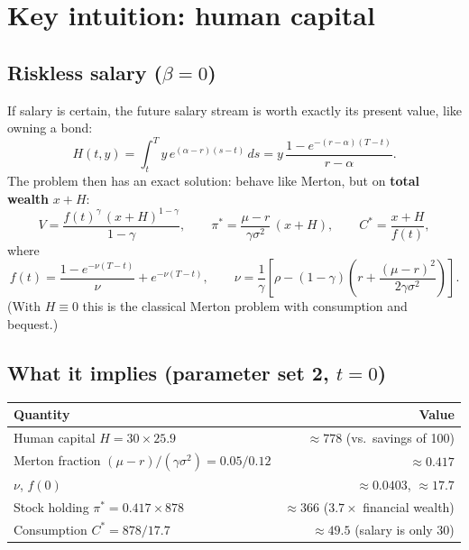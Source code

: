 \documentclass[11pt]{article}
\begin{document}
\section{Key intuition: human capital}

\subsection{Riskless salary ($\beta=0$)}
If salary is certain, the future salary stream is worth exactly its present value,
like owning a bond:
\begin{equation}\label{eq:human-capital}
H(t,y) = \int_t^T y\,e^{(\alpha-r)(s-t)}\,ds
       = y\,\frac{1-e^{-(r-\alpha)(T-t)}}{r-\alpha}.
\end{equation}
The problem then has an exact solution: behave like Merton, but on
\textbf{total wealth} $x+H$:
\begin{equation}\label{eq:det-income}
V = \frac{f(t)^\gamma\,(x+H)^{1-\gamma}}{1-\gamma},\qquad
\pi^* = \frac{\mu-r}{\gamma\sigma^2}\,(x+H),\qquad
C^* = \frac{x+H}{f(t)},
\end{equation}
where
\[
f(t) = \frac{1-e^{-\nu(T-t)}}{\nu} + e^{-\nu(T-t)},
\qquad
\nu = \frac{1}{\gamma}\left[\rho - (1-\gamma)\left(r + \frac{(\mu-r)^2}{2\gamma\sigma^2}\right)\right].
\]
(With $H\equiv0$ this is the classical Merton problem with consumption and bequest.)

\subsection{What it implies (parameter set 2, $t=0$)}
\begin{center}
\begin{tabular}{lr}
\toprule
Quantity & Value \\
\midrule
Human capital $H = 30\times 25.9$ & $\approx 778$ \quad(vs.\ savings of 100) \\
Merton fraction $(\mu-r)/(\gamma\sigma^2) = 0.05/0.12$ & $\approx 0.417$ \\
$\nu$,\; $f(0)$ & $\approx 0.0403$,\; $\approx 17.7$ \\
Stock holding $\pi^* = 0.417\times 878$ & $\approx 366$ \quad($3.7\times$ financial wealth) \\
Consumption $C^* = 878/17.7$ & $\approx 49.5$ \quad(salary is only 30) \\
\bottomrule
\end{tabular}
\end{center}
\end{document}
